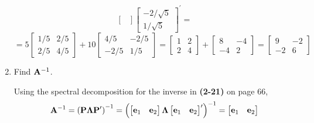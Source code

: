\begin{enumerate}[label=(\alph*)]
\[\begin{bmatrix}
                \end{bmatrix}
                \begin{bmatrix}
                    -2/\sqrt{5} \\
                    1/\sqrt{5}
                \end{bmatrix}^\prime = 
            \]
            \[
                =
                5 \begin{bmatrix}
                    1/5 & 2/5 \\
                    2/5 & 4/5
                \end{bmatrix} + 
                10 \begin{bmatrix}
                    4/5 & -2/5 \\
                    -2/5 & 1/5
                \end{bmatrix}
                =
                \begin{bmatrix}
                    1 & 2 \\
                    2 & 4
                \end{bmatrix} + 
                \begin{bmatrix}
                    8 & -4 \\
                    -4 & 2
                \end{bmatrix} =
                \begin{bmatrix}
                    9 & -2 \\
                    -2 & 6
                \end{bmatrix}
            \]
            \item Find $\bold{A}^{-1}$.
            \par
            Using the spectral decomposition for the inverse in \textbf{(2-21)} on page 66,
            \[
                \bold{A}^{-1} = 
                {\left(\bold{P}
                \bold{\Lambda}
                \bold{P}^\prime\right)}^{-1} = 
                {\left(\begin{bmatrix}
                    \bold{e}_1 & \bold{e}_2
                \end{bmatrix}
                \bold{\Lambda}
                \begin{bmatrix}
                    \bold{e}_1 & \bold{e}_2
                \end{bmatrix}^\prime\right)}^{-1} = 
                \begin{bmatrix}
                    \bold{e}_1 & \bold{e}_2
                \end{bmatrix}
\]
\end{enumerate}
